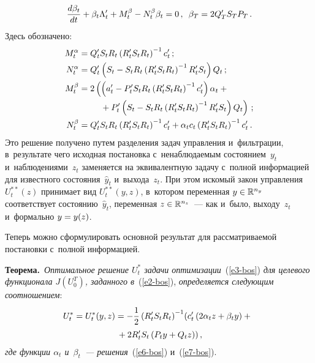 \begin{multicols}{2}
\noindent
\begin{equation}
\displaystyle\frac{\displaystyle d\beta_t\mathstrut}{\displaystyle dt\mathstrut}+ \beta_t \Lambda_t^\prime +M_t^\beta -N_t^\beta 
\beta_t=0\,,\enskip 
\beta_T=2Q_T^\prime S_T P_T\,.
\label{e7-bos}
\end{equation}
Здесь обозначено:
\begin{align*}
M_t^\alpha &= Q^\prime_t S_t R_t \left( R_t^\prime S_t R_t\right)^{-1} c_t^\prime\,;\\
N_t^\alpha &= Q^\prime_t \left( S_t -S_t R_t\left( R_t^\prime S_t R_t\right)^{-
1}R_t^\prime S_t\right) Q_t\,;\\
M_t^\beta &= 2\left(\left( a_t^\prime -P_t^\prime S_t R_t \left( R_t^\prime S_t 
R_t\right)^{-1} c_t^\prime\right) \alpha_t +{}\right.\\
&\hspace*{8mm}\left.{}+P_t^\prime \left( S_t -S_t R_t \left( 
R_t^\prime S_t R_t\right)^{-1} R_t^\prime S_t\right) Q_t\right)\,;\\
N_t^\beta &= Q_t^\prime S_t R_t \left( R_t^\prime S_t R_t\right)^{-1} c_t^\prime 
+\alpha_t c_t \left( R_t^\prime S_t R_t\right)^{-1} c_t^\prime\,.
\end{align*}
          Это решение получено путем разделения задач управления 
и~фильтрации, в~результате чего исходная постановка с~ненаблюдаемым 
состоянием~$y_t$ и~наблюдениями~$z_t$ заменяется на эквивалентную 
задачу с~полной информацией для известного состояния~$\hat{y}_t$ 
и~выхода~$z_t$. При этом искомый закон управления~$U_t^{**}(z)$ 
принимает вид $U_t^{**}(y,z)$, в~котором переменная $y\hm\in 
\mathbb{R}^{n_y}$ соответствует состоянию~$\hat{y}_t$, переменная 
$z\hm\in \mathbb{R}^{n_z}$~--- как и~было, выходу~$z_t$ и~формально 
$y\hm= y(z)$.
     
     Теперь можно сформулировать основной результат для 
рассматриваемой постановки с~полной информацией.
     
     \smallskip
     
     \noindent
     \textbf{Теорема.}\ \textit{Оптимальное решение $U_t^*$ задачи 
оптимизации}~(\ref{e3-bos}) \textit{для целевого функционала $J(U_0^T)$, 
заданного в}~(\ref{e2-bos}), \textit{определяется следующим 
соотношением}:
     \begin{multline}
     \!U_t^*= U_t^*(y,z) =-\displaystyle\frac{\displaystyle 1\mathstrut}{\displaystyle 2\mathstrut} \left( R_t^\prime S_t R_t\right)^{-1}\! \left( 
c_t^\prime \left( 2\alpha_t z+\beta_t y\right) +{}\right.\\
\left.{}+2R_t^\prime S_t \left( P_t y+Q_t 
z\right)\right),
     \label{e8-bos}
     \end{multline}
\textit{где функции $\alpha_t$ и~$\beta_t$~--- решения}~(\ref{e6-bos}) и~(\ref{e7-bos}).


\end{multicols}
